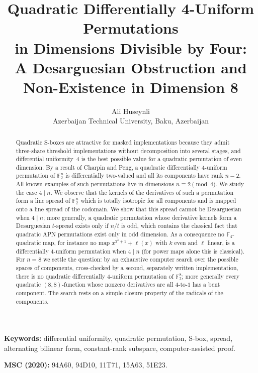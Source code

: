 \documentclass[11pt]{article}
\title{Quadratic Differentially 4-Uniform Permutations\\ in Dimensions Divisible by Four:\\
A Desarguesian Obstruction and Non-Existence in Dimension 8}
\author{Ali Huseynli\\ \small Azerbaijan Technical University, Baku, Azerbaijan}
\date{}
\theoremstyle{definition}
\newcommand{\F}{\mathbb{F}}
\begin{document}
\maketitle

\begin{abstract}
Quadratic S-boxes are attractive for masked implementations because they admit three-share
threshold implementations without decomposition into several stages, and differential
uniformity~$4$ is the best possible value
for a quadratic permutation of even dimension. By a result of Charpin and Peng, a quadratic
differentially 4-uniform permutation of $\F_2^n$ is differentially two-valued and all its
components have rank $n-2$. All known examples of such permutations live in dimensions
$n\equiv 2\pmod 4$. We study
the case $4\mid n$. We observe that the kernels of the derivatives of such a permutation form a
line spread of $\F_2^n$ which is totally isotropic for all components and is mapped onto a line
spread of the codomain. We show that this spread cannot be Desarguesian when
$4\mid n$; more generally, a quadratic permutation whose derivative kernels form a Desarguesian
$t$-spread exists only if $n/t$ is odd, which contains the classical fact that quadratic APN
permutations exist only in odd dimension. As a consequence no $\F_4$-quadratic map, for instance
no map $x^{2^k+1}+\ell(x)$ with $k$ even and $\ell$ linear, is a differentially 4-uniform permutation
when $4\mid n$ (for power maps alone this is classical). For
$n=8$ we settle the question: by an exhaustive computer search over the possible spaces of
components, cross-checked by a second, separately written implementation, there is no quadratic differentially
4-uniform permutation of $\F_2^8$; more generally every quadratic $(8,8)$-function whose
nonzero derivatives are all $4$-to-$1$ has a bent component. The search rests on a simple
closure property of the radicals of the components.
\end{abstract}

\noindent\textbf{Keywords:} differential uniformity, quadratic permutation, S-box, spread,
alternating bilinear form, constant-rank subspace, computer-assisted proof.

\noindent\textbf{MSC (2020):} 94A60, 94D10, 11T71, 15A63, 51E23.
\end{document}
